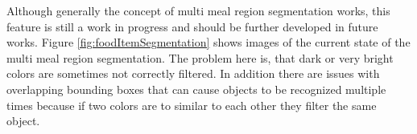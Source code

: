 Although generally the concept of multi meal region segmentation works, this feature is still a work in progress and should be further developed in future works. Figure \ref{fig:foodItemSegmentation} shows images of the current state of the multi meal region segmentation. The problem here is, that dark or very bright colors are sometimes not correctly filtered. In addition there are issues with overlapping bounding boxes that can cause objects to be recognized multiple times because if two colors are to similar to each other they filter the same object. 